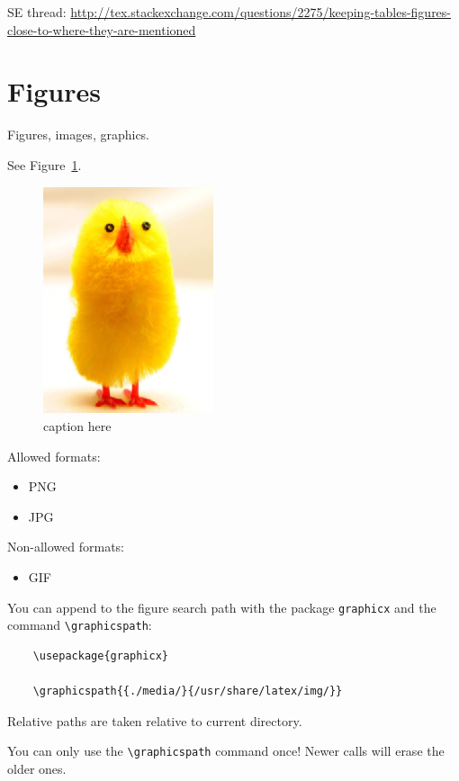 \documentclass[12pt]{article}
\begin{document}
  SE thread: \url{http://tex.stackexchange.com/questions/2275/keeping-tables-figures-close-to-where-they-are-mentioned}

\section{Figures}\label{figures}

  Figures, images, graphics.

  See Figure~\ref{fig-label}.

  \begin{figure}[htb]
    \includegraphics[width=5cm]{image.png}
    \caption{caption here}
    \label{fig-label}
  \end{figure}

  Allowed formats:

  \begin{itemize}
    \item PNG
    \item JPG
  \end{itemize}

  Non-allowed formats:

  \begin{itemize}
    \item GIF
  \end{itemize}

  You can append to the figure search path with the package \lstinline|graphicx| and the command \lstinline|\graphicspath|:

  \begin{lstlisting}
    \usepackage{graphicx}

    \graphicspath{{./media/}{/usr/share/latex/img/}}
  \end{lstlisting}

  Relative paths are taken relative to current directory.

  You can only use the \lstinline|\graphicspath| command once! Newer calls will erase the older ones.
\end{document}
